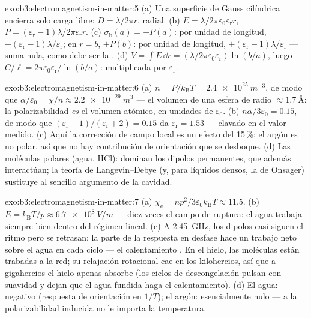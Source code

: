 \begin{solution}{exo:b3:electromagnetism-in-matter:5}
(a) Una superficie de Gauss cilíndrica encierra solo carga libre:
$D = \lambda/2\pi r$, radial. (b) $E =
\lambda/2\pi\varepsilon_0\varepsilon_{\text{r}}r$, $P =
(\varepsilon_{\text{r}}-1)\lambda/2\pi\varepsilon_{\text{r}}r$.
(c) $\sigma_{\text{b}}(a) = -P(a)$: por unidad de longitud,
$-(\varepsilon_{\text{r}}-1)\lambda/\varepsilon_{\text{r}}$;
en $r = b$, $+P(b)$: por unidad de longitud,
$+(\varepsilon_{\text{r}}-1)\lambda/\varepsilon_{\text{r}}$ ---
suma nula, como debe ser la . (d) $V = \int E\,\dd r =
(\lambda/2\pi\varepsilon_0\varepsilon_{\text{r}})\ln(b/a)$, luego
$C/\ell = 2\pi\varepsilon_0\varepsilon_{\text{r}}/\ln(b/a)$:
multiplicada por $\varepsilon_{\text{r}}$.
\end{solution}

\begin{solution}{exo:b3:electromagnetism-in-matter:6}
(a) $n = P/k_{\text{B}}T = \qty{2.4e25}{m^{-3}}$, de modo que
$\alpha/\varepsilon_0 = \chi/n \approx \qty{2.2e-29}{m^3}$ ---
el volumen de una esfera de radio $\approx\qty{1.7}{\angstrom}$:
la polarizabilidad \emph{es} el volumen atómico, en unidades de $\varepsilon_0$.
(b) $n\alpha/3\varepsilon_0 = 0.15$, de modo que $(\varepsilon_{\text{r}} -
1)/(\varepsilon_{\text{r}} + 2) = 0.15$ da
$\varepsilon_{\text{r}} = 1.53$ --- clavado en el valor medido.
(c) Aquí la corrección de campo local es un efecto del 15\,\%; el argón es
no polar, así que no hay contribución de orientación que se desboque. (d)
Las moléculas polares (agua, HCl): dominan los dipolos permanentes, que además
interactúan; la teoría de Langevin--Debye (y, para líquidos densos, la de Onsager)
sustituye al sencillo argumento de la cavidad.
\end{solution}

\begin{solution}{exo:b3:electromagnetism-in-matter:7}
(a) $\chi_{\text{e}} = np^2/3\varepsilon_0k_{\text{B}}T \approx
11.5$. (b) $E = k_{\text{B}}T/p \approx \qty{6.7e8}{V/m}$ ---
diez veces el campo de ruptura: el agua trabaja siempre bien dentro del
régimen lineal. (c) A \qty{2.45}{GHz}, los dipolos casi siguen el ritmo
pero se retrasan: la parte de la respuesta en desfase hace un trabajo neto sobre
el agua en cada ciclo --- el calentamiento . En el hielo, las moléculas
están trabadas a la red; su relajación rotacional cae en los
kilohercios, así que a gigahercios el hielo apenas absorbe (los ciclos de descongelación
pulsan con suavidad y dejan que el agua fundida haga el calentamiento). (d) El agua:
negativo (respuesta de orientación en $1/T$); el argón: esencialmente nulo ---
a la polarizabilidad inducida no le importa la temperatura.
\end{solution}

